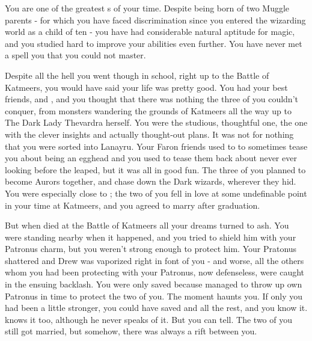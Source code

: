 \documentclass[char]{Katmeers}
\begin{document}
\name{\cHermione{}}


You are one of the greatest \cHermione{\magician}s of your time. Despite being born of two Muggle parents - for which you have faced discrimination since you entered the wizarding world as a child of ten - you have had considerable natural aptitude for magic, and you studied hard to improve your abilities even further. You have never met a spell you that you could not master.

Despite all the hell you went though in school, right up to the Battle of Katmeers, you would have said your life was pretty good. You had your best friends, \cRon{} and \cHarry{}, and you thought that there was nothing the three of you couldn't conquer, from monsters wandering the grounds of Katmeers all the way up to The Dark Lady Thevardra herself. You were the studious, thoughtful one, the one with the clever insights and actually thought-out plans. It was not for nothing that you were sorted into Lanayru. Your Faron friends used to to sometimes tease you about being an egghead and you used to tease them back about never ever looking before the leaped, but it was all in good fun. The three of you planned to become Aurors together, and chase down the Dark wizards, wherever they hid. You were especially close to \cRon{}; the two of you fell in love at some undefinable point in your time at Katmeers, and you agreed to marry \cRon{\them} after graduation.

But when \cHarry{} died at the Battle of Katmeers all your dreams turned to ash. You were standing nearby when it happened, and you tried to shield him with your Patronus charm, but you weren't strong enough to protect him. Your Pratonus shattered and Drew was vaporized right in font of you - and worse, all the others whom you had been protecting with your Patronus, now defenseless, were caught in the ensuing backlash. You were only saved because \cRon{} managed to throw up \cRon{\their} own Patronus in time to protect the two of you. The moment haunts you. If only you had been a little stronger, you could have saved \cHarry{} and all the rest, and you know it. \cRon{} knows it too, although he never speaks of it. But you can tell. The two of you still got married, but somehow, there was always a rift between you.
\end{document}
